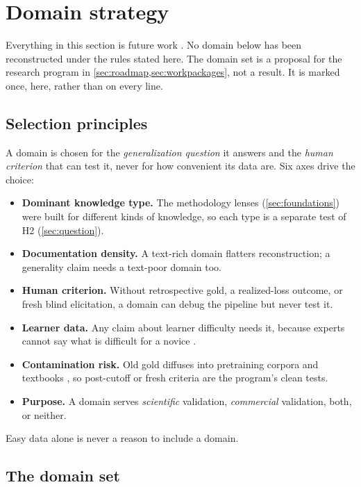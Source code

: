 \section{Domain strategy}
\label{sec:domains}

Everything in this section is future work \evfut{}. No domain below has been reconstructed
under the rules stated here. The domain set is a proposal for the research program in
\cref{sec:roadmap,sec:workpackages}, not a result. It is marked once, here, rather than on
every line.

\subsection{Selection principles}

A domain is chosen for the \emph{generalization question} it answers and the \emph{human
criterion} that can test it, never for how convenient its data are. Six axes drive the choice:

\begin{itemize}[noitemsep]
  \item \textbf{Dominant knowledge type.} The methodology lenses (\cref{sec:foundations}) were
    built for different kinds of knowledge, so each type is a separate test of H2
    (\cref{sec:question}).
  \item \textbf{Documentation density.} A text-rich domain flatters reconstruction; a generality
    claim needs a text-poor domain too.
  \item \textbf{Human criterion.} Without retrospective gold, a realized-loss outcome, or fresh
    blind elicitation, a domain can debug the pipeline but never test it.
  \item \textbf{Learner data.} Any claim about learner difficulty needs it, because experts cannot
    say what is difficult for a novice \evlit{} \parencite{nathan2003expert,maries2016teaching}.
  \item \textbf{Contamination risk.} Old gold diffuses into pretraining corpora and textbooks
    \evlit{} \parencite{golchin2023time,sainz2023nlp}, so post-cutoff or fresh criteria are the
    program's clean tests.
  \item \textbf{Purpose.} A domain serves \emph{scientific} validation, \emph{commercial}
    validation, both, or neither.
\end{itemize}

Easy data alone is never a reason to include a domain.

\subsection{The domain set}

